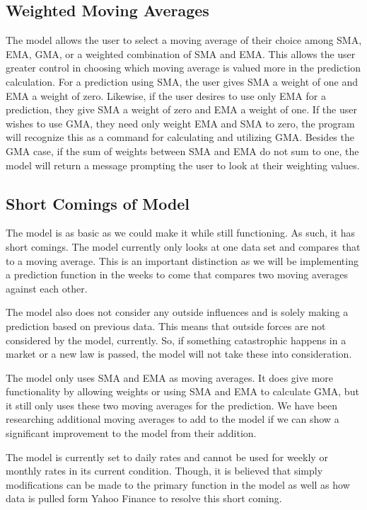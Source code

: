 \documentclass[11pt]{article}
\begin{document}
\subsection*{Weighted Moving Averages}\label{WMA}
The model allows the user to select a moving average of their choice among SMA, EMA, GMA, or a weighted combination of SMA and EMA. This allows the user greater control in choosing which moving average is valued more in the prediction calculation. For a prediction using SMA, the user gives SMA a weight of one and EMA a weight of zero. Likewise, if the user desires to use only EMA for a prediction, they give SMA a weight of zero and EMA a weight of one. If the user wishes to use GMA, they need only weight EMA and SMA to zero, the program will recognize this as a command for calculating and utilizing GMA. Besides the GMA case, if the sum of weights between SMA and EMA do not sum to one, the model will return a message prompting the user to look at their weighting values.

\subsection*{Short Comings of Model}\label{SCM}
The model is as basic as we could make it while still functioning. As such, it has short comings. The model currently only looks at one data set and compares that to a moving average. This is an important distinction as we will be implementing a prediction function in the weeks to come that compares two moving averages against each other.

The model also does not consider any outside influences and is solely making a prediction based on previous data. This means that outside forces are not considered by the model, currently. So, if something catastrophic happens in a market or a new law is passed, the model will not take these into consideration.

The model only uses SMA and EMA as moving averages. It does give more functionality by allowing weights or using SMA and EMA to calculate GMA, but it still only uses these two moving averages for the prediction. We have been researching additional moving averages to add to the model if we can show a significant improvement to the model from their addition.

The model is currently set to daily rates and cannot be used for weekly or monthly rates in its current condition. Though, it is believed that simply modifications can be made to the primary function in the model as well as how data is pulled form Yahoo Finance to resolve this short coming.
\end{document}
